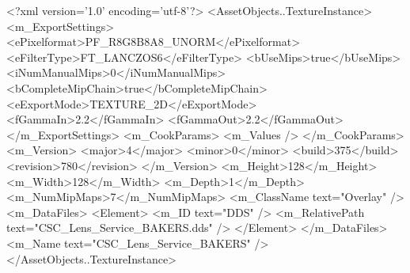 <?xml version='1.0' encoding='utf-8'?>
<AssetObjects..TextureInstance>
  <m_ExportSettings>
    <ePixelformat>PF_R8G8B8A8_UNORM</ePixelformat>
    <eFilterType>FT_LANCZOS6</eFilterType>
    <bUseMips>true</bUseMips>
    <iNumManualMips>0</iNumManualMips>
    <bCompleteMipChain>true</bCompleteMipChain>
    <eExportMode>TEXTURE_2D</eExportMode>
    <fGammaIn>2.2</fGammaIn>
    <fGammaOut>2.2</fGammaOut>
  </m_ExportSettings>
  <m_CookParams>
    <m_Values />
  </m_CookParams>
  <m_Version>
    <major>4</major>
    <minor>0</minor>
    <build>375</build>
    <revision>780</revision>
  </m_Version>
  <m_Height>128</m_Height>
  <m_Width>128</m_Width>
  <m_Depth>1</m_Depth>
  <m_NumMipMaps>7</m_NumMipMaps>
  <m_ClassName text="Overlay" />
  <m_DataFiles>
    <Element>
      <m_ID text="DDS" />
      <m_RelativePath text="CSC_Lens_Service_BAKERS.dds" />
    </Element>
  </m_DataFiles>
  <m_Name text="CSC_Lens_Service_BAKERS" />
</AssetObjects..TextureInstance>
